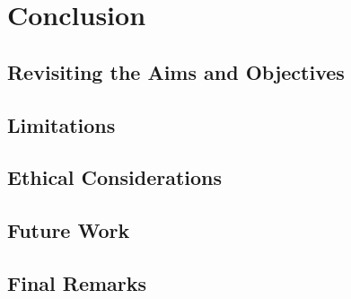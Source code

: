 \graphicspath{{content/chapters/6_conclusion/figures/}}

\chapter{Conclusion}%
\label{chp:conclusion}

\section{Revisiting the Aims and Objectives}%
\label{sec:revisiting_aims_and_objectives}

\section{Limitations}%
\label{sec:limitations}

\section{Ethical Considerations}
\label{sec:ethical_considerations}

\section{Future Work}%
\label{sec:future_work}

\section{Final Remarks}%
\label{sec:final_remarks}

